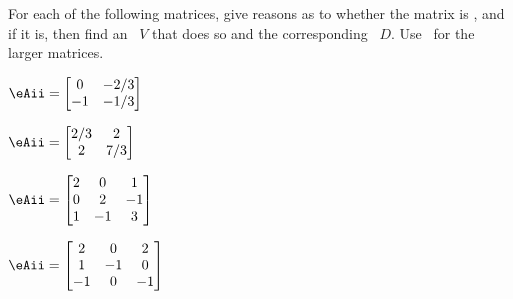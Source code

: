 \begin{exercise}  
For each of the following matrices, give reasons as to whether the matrix is , and if it is, then find an ~\(V\) that does so and the corresponding ~\(D\).
Use \script\ for the larger matrices.

\begin{Parts}
\begin{OmitV1}
\item \(\eAii=\begin{bmatrix} 0&-2/3
\\-1&-1/3 \end{bmatrix}\)

\item \(\eAii=\begin{bmatrix} 2/3&2
\\2&7/3 \end{bmatrix}\)
\end{OmitV1}

\item \(\eAii=\begin{bmatrix} 2&0&1
\\0&2&-1
\\1&-1&3 \end{bmatrix}\)

\item \(\eAii=\begin{bmatrix} 2&0&2
\\1&-1&0
\\-1&0&-1 \end{bmatrix}\)


\end{Parts}
\end{exercise}
